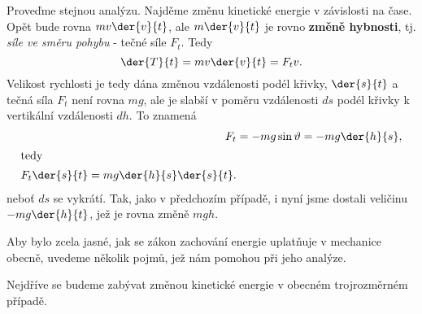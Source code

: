     Proveďme stejnou analýzu. Najděme změnu kinetické energie v závislosti na čase. Opět bude    
    rovna \(mv\der{v}{t}\), ale \(m\der{v}{t}\) je rovno \textbf{změně hybnosti}, tj. \emph{síle ve 
    směru pohybu} - tečné síle \(F_t\). Tedy
    \begin{equation}\label{fyz:eq028}
      \der{T}{t} = mv\der{v}{t} = F_tv.
    \end{equation}
    Velikost rychlosti je tedy dána změnou vzdálenosti podél křivky, \(\der{s}{t}\) a tečná síla 
    \(F_t\) není rovna \(mg\), ale je slabší v poměru vzdálenosti \(ds\) podél křivky k vertikální 
    vzdálenosti \(dh\). To znamená
    \begin{align}
      F_t &= -mg\sin\vartheta = -mg\der{h}{s},  \nonumber \\
      \shortintertext{tedy}
      F_t\der{s}{t} = mg\der{h}{s}\der{s}{t}.   \label{fyz:eq029}
    \end{align}
    neboť \(ds\) se vykrátí. Tak, jako v předchozím případě, i nyní jsme dostali veličinu \(- 
    mg\der{h}{t}\), jež je rovna změně \(mgh\).
    
    Aby bylo zcela jasné, jak se zákon zachování energie uplatňuje v mechanice obecně, uvedeme    
    několik pojmů, jež nám pomohou při jeho analýze.
    
    Nejdříve se budeme zabývat změnou kinetické energie v obecném trojrozměrném případě.
    
